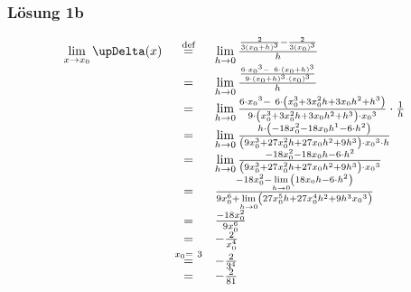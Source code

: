 \documentclass[main.tex]{subfiles}
\begin{document}
\subsubsection*{Lösung 1b}
\begin{equation*}
    \begin{array}{ c c l }
    \lim\limits _{x\rightarrow x_{0}} \upDelta ( x) & \eqdef  & \lim\limits _{h\rightarrow 0}\frac{\frac{2}{3( x_{0} +h)^{3}} -\frac{2}{3( x_{0})^{3}}}{h}\\
    & = & \lim\limits _{h\rightarrow 0}\frac{\frac{6\cdotp x{_{0}}^{3} -\ 6\cdotp ( x_{0} +h)^{3}}{9\cdotp ( x_{0} +h)^{3} \cdotp ( x_{0})^{3}}}{h}\\
    & = & \lim\limits _{h\rightarrow 0}\frac{6\cdotp x{_{0}}^{3} -\ 6\cdotp \left( x_{0}^{3} +3x_{0}^{2} h+3x_{0} h^{2} +h^{3}\right)}{9\cdotp \left( x_{0}^{3} +3x_{0}^{2} h+3x_{0} h^{2} +h^{3}\right) \cdotp x{_{0}}^{3}} \cdotp \frac{1}{h}\\
    & = & \lim\limits _{h\rightarrow 0}\frac{h\cdotp \left( -18x_{0}^{2} -18x_{0} h^{1} -6\cdotp h^{2}\right)}{\left( 9x_{0}^{3} +27x_{0}^{2} h+27x_{0} h^{2} +9h^{3}\right) \cdotp x{_{0}}^{3} \cdotp h}\\
    & = & \lim\limits _{h\rightarrow 0}\frac{-18x_{0}^{2} -18x_{0} h -6\cdotp h^{2}}{\left( 9x_{0}^{3} +27x_{0}^{2} h+27x_{0} h^{2} +9h^{3}\right) \cdotp x{_{0}}^{3}}\\
    & = & \frac{-18x_{0}^{2} -\lim\limits _{h\rightarrow 0}\left( 18x_{0} h -6\cdotp h^{2}\right)}{9x_{0}^{6} +\lim\limits _{h\rightarrow 0}\left( 27x_{0}^{5} h+27x_{0}^{4} h^{2} +9h^{3} x{_{0}}^{3}\right)}\\
    & = & \frac{-18x_{0}^{2}}{9x_{0}^{6}}\\
    & = & -\frac{2}{x_{0}^{4}}\\
    & \overset{x_{0} =\ 3}{=} & -\frac{2}{3^{4}}\\
    & = & -\frac{2}{81}
    \end{array}
\end{equation*}
\end{document}
